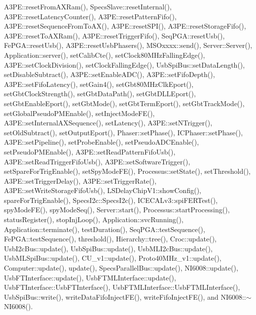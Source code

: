 A3\+P\+E\+::reset\+From\+A\+X\+Ram(), Specs\+Slave\+::reset\+Internal(), A3\+P\+E\+::reset\+Latency\+Counter(), A3\+P\+E\+::reset\+Pattern\+Fifo(), A3\+P\+E\+::reset\+Sequence\+From\+To\+A\+X(), A3\+P\+E\+::reset\+S\+P\+I(), A3\+P\+E\+::reset\+Storage\+Fifo(), A3\+P\+E\+::reset\+To\+A\+X\+Ram(), A3\+P\+E\+::reset\+Trigger\+Fifo(), Seq\+P\+G\+A\+::reset\+Usb(), Fe\+P\+G\+A\+::reset\+Usb(), A3\+P\+E\+::reset\+Usb\+Phasers(), M\+S\+Oxxxx\+::send(), Server\+::\+Server(), Application\+::server(), set\+Calib\+Cte(), set\+Clock80\+M\+Hz\+Falling\+Edge(), A3\+P\+E\+::set\+Clock\+Division(), set\+Clock\+Falling\+Edge(), Usb\+Spi\+Bus\+::set\+Data\+Length(), set\+Disable\+Subtract(), A3\+P\+E\+::set\+Enable\+A\+D\+C(), A3\+P\+E\+::set\+Fifo\+Depth(), A3\+P\+E\+::set\+Fifo\+Latency(), set\+Gain4(), set\+Gbt80\+M\+Hz\+Clk\+Eport(), set\+Gbt\+Clock\+Strength(), set\+Gbt\+Data\+Path(), set\+Gbt\+D\+L\+L\+Eport(), set\+Gbt\+Enable\+Eport(), set\+Gbt\+Mode(), set\+Gbt\+Term\+Eport(), set\+Gbt\+Track\+Mode(), set\+Global\+Pseudo\+P\+M\+Enable(), set\+Inject\+Mode\+F\+E(), A3\+P\+E\+::set\+Internal\+A\+X\+Sequence(), set\+Latency(), A3\+P\+E\+::set\+N\+Trigger(), set\+Old\+Subtract(), set\+Output\+Eport(), Phaser\+::set\+Phase(), I\+C\+Phaser\+::set\+Phase(), A3\+P\+E\+::set\+Pipeline(), set\+Probe\+Enable(), set\+Pseudo\+A\+D\+C\+Enable(), set\+Pseudo\+P\+M\+Enable(), A3\+P\+E\+::set\+Read\+Pattern\+Fifo\+Usb(), A3\+P\+E\+::set\+Read\+Trigger\+Fifo\+Usb(), A3\+P\+E\+::set\+Software\+Trigger(), set\+Spare\+For\+Trig\+Enable(), set\+Spy\+Mode\+F\+E(), Processus\+::set\+State(), set\+Threshold(), A3\+P\+E\+::set\+Trigger\+Delay(), A3\+P\+E\+::set\+Trigger\+Rate(), A3\+P\+E\+::set\+Write\+Storage\+Fifo\+Usb(), L\+S\+Delay\+Chip\+V1\+::show\+Config(), spare\+For\+Trig\+Enable(), Specs\+I2c\+::\+Specs\+I2c(), I\+C\+E\+C\+A\+Lv3\+::spi\+F\+E\+R\+Test(), spy\+Mode\+F\+E(), spy\+Mode\+Seq(), Server\+::start(), Processus\+::start\+Processing(), status\+Register(), stop\+Inj\+Loop(), Application\+::svc\+Running(), Application\+::terminate(), test\+Duration(), Seq\+P\+G\+A\+::test\+Sequence(), Fe\+P\+G\+A\+::test\+Sequence(), threshold(), Hierarchy\+::tree(), Croc\+::update(), Usb\+I2c\+Bus\+::update(), Usb\+Spi\+Bus\+::update(), Usb\+M\+L\+I2c\+Bus\+::update(), Usb\+M\+L\+Spi\+Bus\+::update(), C\+U\+\_\+v1\+::update(), Proto40\+M\+Hz\+\_\+v1\+::update(), Computer\+::update(), update(), Specs\+Parallel\+Bus\+::update(), N\+I6008\+::update(), Usb\+F\+T\+Interface\+::update(), Usb\+F\+T\+M\+L\+Interface\+::update(), Usb\+F\+T\+Interface\+::\+Usb\+F\+T\+Interface(), Usb\+F\+T\+M\+L\+Interface\+::\+Usb\+F\+T\+M\+L\+Interface(), Usb\+Spi\+Bus\+::write(), write\+Data\+Fifo\+Inject\+F\+E(), write\+Fifo\+Inject\+F\+E(), and N\+I6008\+::$\sim$\+N\+I6008().


